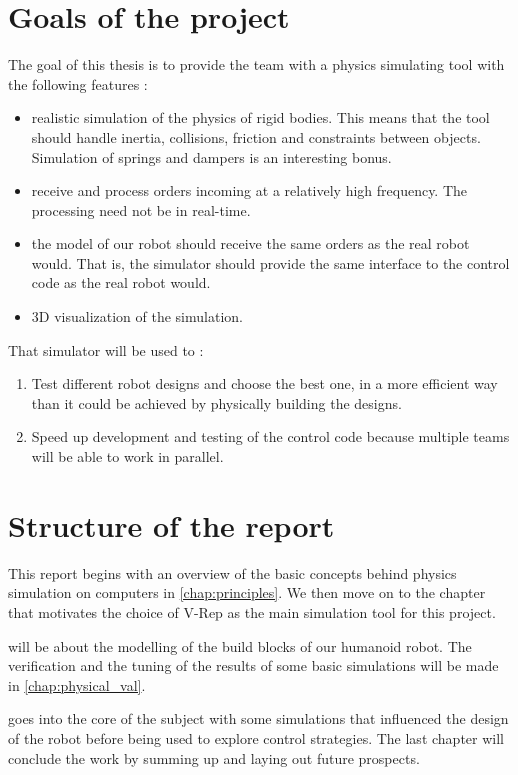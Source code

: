 \section{Goals of the project}
The goal of this thesis is to provide the team with a physics simulating tool with the following features :
\begin{itemize}
\item realistic simulation of the physics of rigid bodies. This means that the tool should handle inertia, collisions, friction and constraints between objects. Simulation of springs and dampers is an interesting bonus.
\item receive and process orders incoming at a relatively high frequency. The processing need not be in real-time.
\item the model of our robot should receive the same orders as the real robot would. That is, the simulator should provide the same interface to the control code as the real robot would. 
\item 3D visualization of the simulation.
\end{itemize}

That simulator will be used to :
\begin{enumerate}
\item Test different robot designs and choose the best one, in a more efficient way than it could be achieved by physically building the designs.
\item Speed up development and testing of the control code because multiple teams will be able to work in parallel. 
\end{enumerate}

\section{Structure of the report}
This report begins with an overview of the basic concepts behind physics simulation on computers in \cref{chap:principles}. We then move on to the chapter that motivates the choice of V-Rep as the main simulation tool for this project.

 will be about the modelling of the build blocks of our humanoid robot. The verification and the tuning of the results of some basic simulations will be made in \cref{chap:physical_val}.

 goes into the core of the subject with some simulations that influenced the design of the robot before being used to explore control strategies. The last chapter will conclude the work by summing up and laying out future prospects.